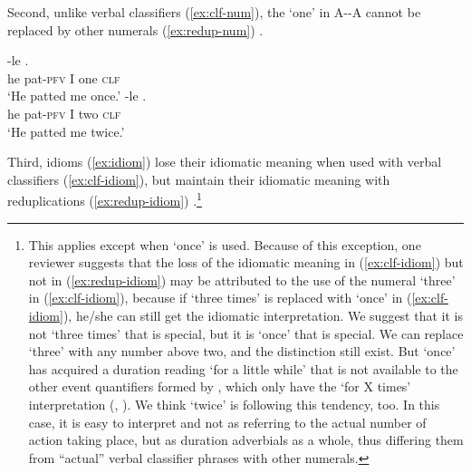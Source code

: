 \ea\label{ex:redup-sep}
\z
\z

Second, unlike verbal classifiers (\ref{ex:clf-num}), the  ‘one’ in A--A cannot be replaced by other numerals (\ref{ex:redup-num}) \citep[299--230]{YangWei2017}.

\ea\label{ex:clf-num}
  \ea \gll {} -le   .\\
   he pat-\textsc{pfv} I one \textsc{clf}\\
   \glt `He patted me once.'
   \ex \gll {} -le   .\\
    he pat-\textsc{pfv} I two \textsc{clf}\\
    \glt `He patted me twice.'
\z
\z

\ea\label{ex:redup-num}
\z
\z

Third, idioms (\ref{ex:idiom}) lose their idiomatic meaning when used with verbal classifiers (\ref{ex:clf-idiom}), but maintain their idiomatic meaning with reduplications (\ref{ex:redup-idiom}) \citep[230--231]{YangWei2017}.\footnote{
This applies except when   `once' is used. 
Because of this exception, one reviewer suggests that the loss of the idiomatic meaning in (\ref{ex:clf-idiom}) 
but not in (\ref{ex:redup-idiom}) may be attributed to the use of the numeral  `three' in (\ref{ex:clf-idiom}),
because if   `three times' is replaced with   `once' in (\ref{ex:clf-idiom}), he/she can still get the idiomatic interpretation.
We suggest that it is not   `three times' that is special, 
but it is   `once' that is special.
We can replace  `three' with any number above two,
and the distinction still exist.
But   `once' has acquired a duration reading `for a little while' that is not available to the other event quantifiers formed by , which only have the `for X times' interpretation (\citealt[77]{Deng2013}, \citealt[16]{Zhang2000}).
We think   `twice' is following this tendency, too.
In this case, it is easy to interpret   and   not as referring to the actual number of action taking place,
but as duration adverbials as a whole,
thus differing them from ``actual'' verbal classifier phrases with other numerals.
}

